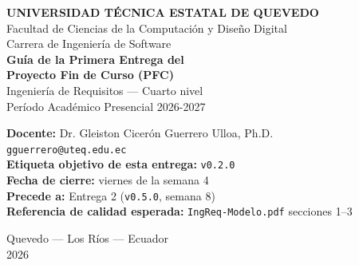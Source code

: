 \documentclass[11pt,a4paper]{article}
\begin{document}
\begin{center}
    \vspace*{1.2cm}
    {\Large\bfseries\textcolor{uteqverde}{UNIVERSIDAD T\'ECNICA ESTATAL DE QUEVEDO}}\\[4pt]
    {\large Facultad de Ciencias de la Computaci\'on y Dise\~no Digital}\\[2pt]
    {\large Carrera de Ingenier\'ia de Software}\\[22pt]

    {\LARGE\bfseries Gu\'ia de la Primera Entrega del}\\[6pt]
    {\LARGE\bfseries Proyecto Fin de Curso (PFC)}\\[16pt]

    {\large Ingenier\'ia de Requisitos --- Cuarto nivel}\\[2pt]
    {\large Per\'iodo Acad\'emico Presencial 2026-2027}\\[22pt]

    \begin{tcolorbox}[colback=uteqverde!8,colframe=uteqverde,arc=3pt,
                      width=0.88\textwidth,boxrule=0.8pt]
        \centering
        \textbf{Docente:} Dr. Gleiston Cicer\'on Guerrero Ulloa, Ph.D.\\[2pt]
        \texttt{gguerrero@uteq.edu.ec}\\[6pt]
        \textbf{Etiqueta objetivo de esta entrega:} \texttt{v0.2.0}\\[2pt]
        \textbf{Fecha de cierre:} viernes de la semana 4\\[2pt]
        \textbf{Precede a:} Entrega 2 (\texttt{v0.5.0}, semana 8)\\[2pt]
        \textbf{Referencia de calidad esperada:} \texttt{IngReq-Modelo.pdf} secciones 1--3
    \end{tcolorbox}

    \vfill

    {\small Quevedo --- Los R\'ios --- Ecuador}\\[2pt]
    {\small 2026}
\end{center}

\newpage

\tableofcontents
\newpage

\end{document}
